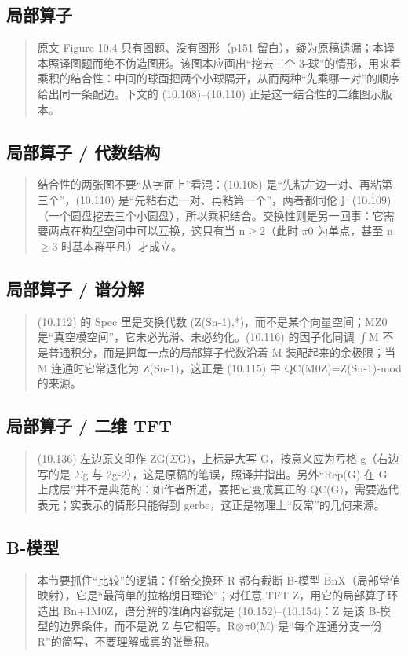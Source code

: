 \subsection*{局部算子}
\begin{quote}\small
原文 Figure 10.4 只有图题、没有图形（p151 留白），疑为原稿遗漏；本译本照译图题而绝不伪造图形。该图本应画出“挖去三个 3-球”的情形，用来看乘积的结合性：中间的球面把两个小球隔开，从而两种“先乘哪一对”的顺序给出同一条配边。下文的 (10.108)--(10.110) 正是这一结合性的二维图示版本。
\end{quote}

\subsection*{局部算子 / 代数结构}
\begin{quote}\small
结合性的两张图不要“从字面上”看混：(10.108) 是“先粘左边一对、再粘第三个”，(10.110) 是“先粘右边一对、再粘第一个”，两者都同伦于 (10.109)（一个圆盘挖去三个小圆盘），所以乘积结合。交换性则是另一回事：它需要两点在构型空间中可以互换，这只有当 n$\ge$2（此时 $\pi$0 为单点，甚至 n$\ge$3 时基本群平凡）才成立。
\end{quote}

\subsection*{局部算子 / 谱分解}
\begin{quote}\small
(10.112) 的 Spec 里是交换代数 (Z(Sn-1),*)，而不是某个向量空间；MZ0 是“真空模空间”，它未必光滑、未必约化。(10.116) 的因子化同调 $\int$M 不是普通积分，而是把每一点的局部算子代数沿着 M 装配起来的余极限；当 M 连通时它常退化为 Z(Sn-1)，这正是 (10.115) 中 QC(M0Z)=Z(Sn-1)-mod 的来源。
\end{quote}

\subsection*{局部算子 / 二维 TFT}
\begin{quote}\small
(10.136) 左边原文印作 ZG($\Sigma$G)，上标是大写 G，按意义应为亏格 g（右边写的是 $\Sigma$g 与 2g-2），这是原稿的笔误，照译并指出。另外“Rep(G) 在 G 上成层”并不是典范的：如作者所述，要把它变成真正的 QC(G)，需要选代表元；实表示的情形只能得到 gerbe，这正是物理上“反常”的几何来源。
\end{quote}

\subsection*{B-模型}
\begin{quote}\small
本节要抓住“比较”的逻辑：任给交换环 R 都有截断 B-模型 BnX（局部常值映射），它是“最简单的拉格朗日理论”；对任意 TFT Z，用它的局部算子环造出 Bn+1M0Z，谱分解的准确内容就是 (10.152)--(10.154)：Z 是该 B-模型的边界条件，而不是说 Z 与它相等。R$\otimes$$\pi$0(M) 是“每个连通分支一份 R”的简写，不要理解成真的张量积。
\end{quote}


